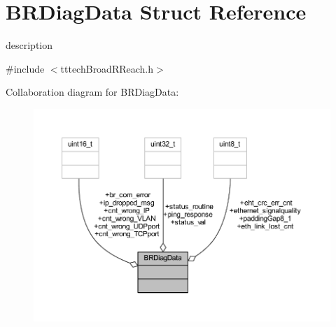 \hypertarget{struct_b_r_diag_data}{}\section{B\+R\+Diag\+Data Struct Reference}
\label{struct_b_r_diag_data}


description  




{\ttfamily \#include $<$tttech\+Broad\+R\+Reach.\+h$>$}



Collaboration diagram for B\+R\+Diag\+Data\+:\nopagebreak
\begin{figure}[H]
\begin{center}
\leavevmode
\includegraphics[width=350pt]{struct_b_r_diag_data__coll__graph}
\end{center}
\end{figure}
